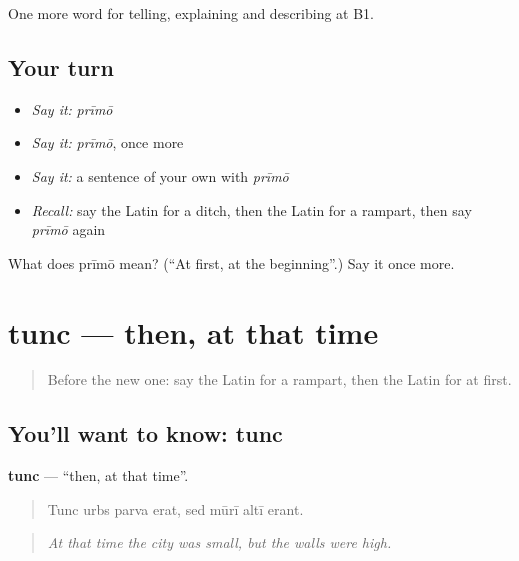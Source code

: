 \begin{grammarlens}[title={What you've built}]
One more word for telling, explaining and describing at B1.
\end{grammarlens}

\subsection*{Your turn}
\begin{itemize}
\raggedright
  \item \emph{Say it:} \emph{prīmō}
  \item \emph{Say it:} \emph{prīmō}, once more
  \item \emph{Say it:} a sentence of your own with \emph{prīmō}
  \item \emph{Recall:} say the Latin for a ditch, then the Latin for a rampart, then say \emph{prīmō} again
\end{itemize}

\begin{tcolorbox}[breakable,colback=teal!4,colframe=teal!35!black,title={Before you move on}]
What does prīmō mean? (\textquotedblleft{}At first, at the beginning\textquotedblright{}.) Say it once more.
\end{tcolorbox}
\section[tunc]{tunc — then, at that time}

\label{lesson:LA-C291-tunc}



\begin{quote}
Before the new one: say the Latin for a rampart, then the Latin for at first.
\end{quote}

\subsection*{You'll want to know: tunc}
\textbf{tunc} — \textquotedblleft{}then, at that time\textquotedblright{}.

\begin{quote}
Tunc urbs parva erat, sed mūrī altī erant.
\end{quote}

\begin{quote}
\emph{At that time the city was small, but the walls were high.}
\end{quote}

